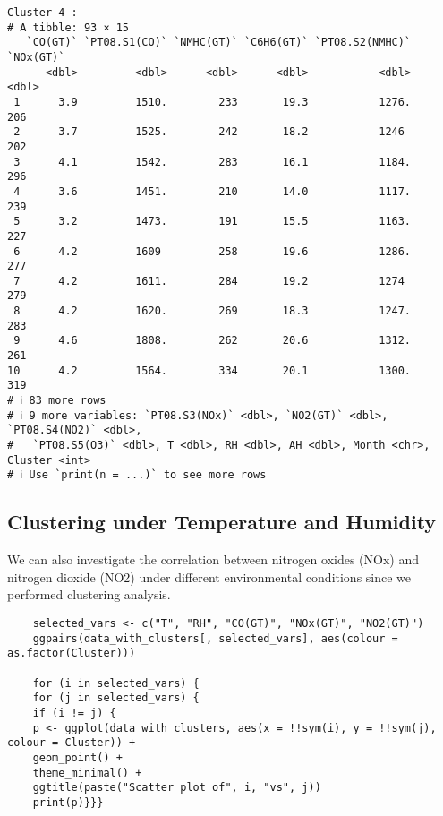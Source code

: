 \documentclass{article}
\begin{document}
\begin{itemize}
\begin{verbatim}
Cluster 4 :
# A tibble: 93 × 15
   `CO(GT)` `PT08.S1(CO)` `NMHC(GT)` `C6H6(GT)` `PT08.S2(NMHC)` `NOx(GT)`
      <dbl>         <dbl>      <dbl>      <dbl>           <dbl>     <dbl>
 1      3.9         1510.        233       19.3           1276.       206
 2      3.7         1525.        242       18.2           1246        202
 3      4.1         1542.        283       16.1           1184.       296
 4      3.6         1451.        210       14.0           1117.       239
 5      3.2         1473.        191       15.5           1163.       227
 6      4.2         1609         258       19.6           1286.       277
 7      4.2         1611.        284       19.2           1274        279
 8      4.2         1620.        269       18.3           1247.       283
 9      4.6         1808.        262       20.6           1312.       261
10      4.2         1564.        334       20.1           1300.       319
# ℹ 83 more rows
# ℹ 9 more variables: `PT08.S3(NOx)` <dbl>, `NO2(GT)` <dbl>, `PT08.S4(NO2)` <dbl>,
#   `PT08.S5(O3)` <dbl>, T <dbl>, RH <dbl>, AH <dbl>, Month <chr>, Cluster <int>
# ℹ Use `print(n = ...)` to see more rows
\end{verbatim}
\end{itemize}
\subsection{Clustering under Temperature and Humidity}
We can also investigate the correlation between nitrogen oxides (NOx) and nitrogen dioxide (NO2) under different environmental conditions since we performed clustering analysis.
    \begin{verbatim}
    selected_vars <- c("T", "RH", "CO(GT)", "NOx(GT)", "NO2(GT)")
    ggpairs(data_with_clusters[, selected_vars], aes(colour = as.factor(Cluster)))

    for (i in selected_vars) {
    for (j in selected_vars) {
    if (i != j) {
    p <- ggplot(data_with_clusters, aes(x = !!sym(i), y = !!sym(j), colour = Cluster)) +
    geom_point() +
    theme_minimal() +
    ggtitle(paste("Scatter plot of", i, "vs", j))
    print(p)}}}
    
    \end{verbatim}
\end{document}
